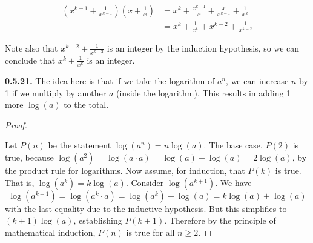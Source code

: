 \documentclass[10pt,]{book}
\theoremstyle{plain}
\theoremstyle{definition}
\theoremstyle{definition}
\theoremstyle{definition}
\theoremstyle{definition}
\numberwithin{equation}{chapter}
\newcommand{\amp}{&}
\begin{document}
\begin{align*}
\left(x^{k-1} + \frac{1}{x^{k-1}}\right)\left(x + \frac{1}{x}\right) \amp = x^k + \frac{x^{k-1}}{x} + \frac{x}{x^{k-1}} + \frac{1}{x^k}\\
\amp = x^k + \frac{1}{x^k} + x^{k-2} + \frac{1}{x^{k-2}}
\end{align*}
%
\par
\hypertarget{p-502}{}%
Note also that \(x^{k-2} + \frac{1}{x^{k-2}}\) is an integer by the induction hypothesis, so we can conclude that \(x^k + \frac{1}{x^k}\) is an integer.%
\par\smallskip
\noindent\textbf{0.5.21.} \hypertarget{p-506}{}%
The idea here is that if we take the logarithm of \(a^n\), we can increase \(n\) by 1 if we multiply by another \(a\) (inside the logarithm). This results in adding 1 more \(\log(a)\) to the total.%
\begin{proof}\hypertarget{proof-20}{}
\hypertarget{p-507}{}%
Let \(P(n)\) be the statement \(\log(a^n) = n \log(a)\). The base case, \(P(2)\) is true, because \(\log(a^2) = \log(a\cdot a) = \log(a) + \log(a) = 2\log(a)\), by the product rule for logarithms. Now assume, for induction, that \(P(k)\) is true. That is, \(\log(a^k) = k\log(a)\). Consider \(\log(a^{k+1})\). We have%
\begin{equation*}
\log(a^{k+1}) = \log(a^k\cdot a) = \log(a^k) + \log(a) = k\log(a) + \log(a)
\end{equation*}
with the last equality due to the inductive hypothesis. But this simplifies to \((k+1) \log(a)\), establishing \(P(k+1)\). Therefore by the principle of mathematical induction, \(P(n)\) is true for all \(n \ge 2\).%
\end{proof}
\par\smallskip
\end{document}
